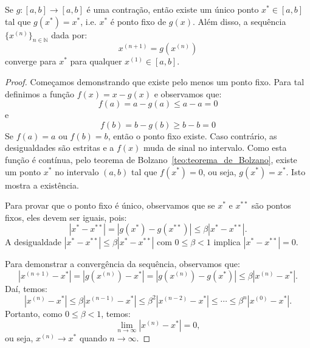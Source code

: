 \begin{teo}
 Se $g:[a,b]\to [a,b]$ é uma contração, então existe um único ponto $x^*\in [a, b]$ tal que $g(x^*)= x^*$, i.e. $x^*$ é ponto fixo de $g(x)$. Além disso, a sequência $\{x^{(n)}\}_{n\in\mathbb{N}}$ dada por:
 \begin{equation*}
   x^{(n+1)}=g(x^{(n)})
 \end{equation*}
converge para $x^*$ para qualquer $x^{(1)}\in [a, b]$.
\end{teo}
\begin{proof}
Começamos demonstrando que existe pelo menos um ponto fixo. Para tal definimos a função $f(x)=x-g(x)$ e observamos que:
\begin{equation*}
  f(a)=a-g(a)\leq a-a=0
\end{equation*}
e
\begin{equation*}
  f(b)=b-g(b)\geq b-b=0
\end{equation*}
Se $f(a)=a$ ou $f(b)=b$, então o ponto fixo existe. Caso contrário, as desigualdades são estritas e a $f(x)$ muda de sinal no intervalo.  Como esta função é contínua, pelo teorema de Bolzano~\ref{teo:teorema_de_Bolzano}, existe um ponto $x^*$ no intervalo $(a, b)$ tal que $f(x^*)=0$, ou seja, $g(x^*)=x^*$. Isto mostra a existência.

Para provar que o ponto fixo é único, observamos que se $x^*$ e $x^{**}$ são pontos fixos, eles devem ser iguais, pois:
\begin{equation*}
  |x^*-x^{**}| = |g(x^{*})-g(x^{**})| \leq \beta |x^*-x^{**}|.
\end{equation*}
A desigualdade $|x^*-x^{**}|\leq \beta |x^*-x^{**}|$ com $0\leq \beta<1$ implica $|x^*-x^{**}|=0$.

Para demonstrar a convergência da sequência, observamos que:
\begin{equation*}
  |x^{(n+1)}-x^*| = |g(x^{(n)})-x^*| = |g(x^{(n)})-g(x^*)| \leq \beta |x^{(n)}-x^*|.
\end{equation*}
Daí, temos:
\begin{equation*}
  |x^{(n)}-x^*|\leq  \beta |x^{(n-1)}-x^*|\leq \beta^2 |x^{(n-2)}-x^*|\leq \cdots \leq \beta^{n}|x^{(0)}-x^*|.
\end{equation*}
Portanto, como $0\leq\beta<1$, temos:
\begin{equation*}
  \lim_{n\to\infty}|x^{(n)}-x^*|=0,
\end{equation*}
ou seja, $x^{(n)}\to x^*$ quando $n\to\infty$.
\end{proof}

